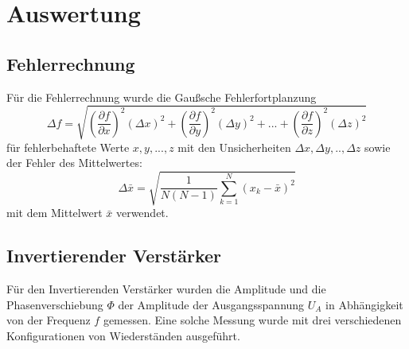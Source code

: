 \newpage
\section{Auswertung}
\label{sec:Auswertung}
\subsection{Fehlerrechnung}
Für die Fehlerrechnung wurde die Gaußsche Fehlerfortplanzung
\begin{equation}
\Delta f=\sqrt{\left(\frac{\partial f}{\partial x}\right)^2(\Delta x)^2+\left(\frac{\partial f}{\partial y}\right)^2(\Delta y)^2+...+\left(\frac{\partial f}{\partial z}\right)^2(\Delta z)^2}
\end{equation}
für fehlerbehaftete Werte $x,y,...,z$ mit den Unsicherheiten $\Delta x,\Delta y,..,\Delta z$ sowie der Fehler des Mittelwertes:
\begin{equation}
\Delta \bar{x}=\sqrt{\frac{1}{N(N-1)}\sum_{k=1}^N(x_k-\bar{x})^2}
\end{equation}
mit dem Mittelwert $\bar{x}$ verwendet.
\subsection{Invertierender Verstärker}
Für den Invertierenden Verstärker wurden die Amplitude und die Phasenverschiebung $\Phi$ der Amplitude der Ausgangsspannung $U_A$ in Abhängigkeit von der Frequenz $f$ gemessen. Eine solche Messung wurde mit drei verschiedenen Konfigurationen von Wiederständen ausgeführt.

